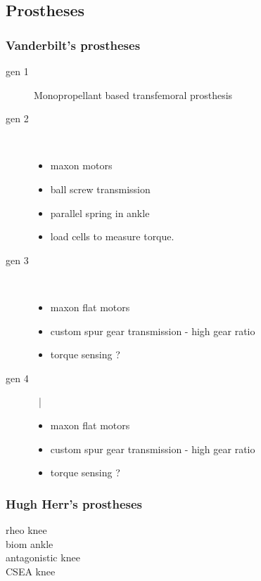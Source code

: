 \subsection{Prostheses}
\subsubsection{Vanderbilt's prostheses}
    \begin{description}
        \item[gen 1] Monopropellant based transfemoral prosthesis
        \item[gen 2] \phantom{text} ~\\
        \begin{itemize}
                \item maxon motors
                \item ball screw transmission
                \item parallel spring in ankle
                \item load cells to measure torque.
            \end{itemize}
        \item[gen 3] ~\\
            \begin{itemize}
                \item maxon flat motors
                \item custom spur gear transmission - high gear ratio
                \item torque sensing ?
            \end{itemize}
        \item[gen 4] ~|\
            \begin{itemize}
                \item maxon flat motors
                \item custom spur gear transmission - high gear ratio
                \item torque sensing ?
            \end{itemize}
    \end{description}
\subsubsection{Hugh Herr's prostheses}
    \begin{description}
        \item[rheo knee]
        \item[biom ankle]
        \item[antagonistic knee]
        \item[CSEA knee]
    \end{description}
